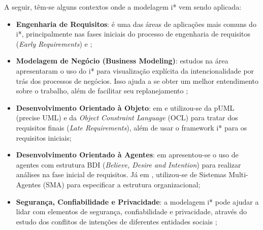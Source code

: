                 A seguir, têm-se alguns contextos onde a modelagem i* vem sendo aplicada:
                    \begin{itemize}
                        \item[] \textbf{Engenharia de Requisitos}:
                            é uma das áreas de aplicações mais comuns do i*, principalmente nas fases iniciais do processo de engenharia de requisitos (\emph{Early Requirements})
                            \cite{yu1997towards} e \cite{maiden2004model};

                        \item[] \textbf{Modelagem de Negócio (Business Modeling)}:
                            estudos na área apresentaram o uso do i* para visualização explícita da intencionalidade por trás dos processos de negócios.
                            Isso ajuda a se obter um melhor entendimento sobre o trabalho, além de facilitar seu replanejamento
                            \cite{yu1996models} \cite{kolp2003organizational};

                        \item[] \textbf{Desenvolvimento Orientado à Objeto}:
                            em \cite{castro2000closing} e \cite{castro2001integrating}
                            utilizou-se da pUML (precise UML) \cite{evans1999core}
                            e da \emph{Object Constraint Language} (OCL) \cite{warmer2003object}
                            para tratar dos requisitos finais (\emph{Late Requirements}), além de usar o framework i* para os requisitos iniciais;

                        \item[] \textbf{Desenvolvimento Orientado à Agentes}:
                            em \cite{bresciani2004tropos} apresentou-se o uso de agentes com estrutura BDI (\emph{Believe, Desire and Intention}) \cite{rao1995bdi} para realizar análises na fase inicial de requisitos.
                            Já em \cite{bastos2004enhancing}, utilizou-se de Sistemas Multi-Agentes (SMA) para especificar a estrutura organizacional;

                        \item[] \textbf{Segurança, Confiabilidade e Privacidade}:
                            a modelagem i* pode ajudar a lidar com elementos de segurança, confiabilidade e privacidade, através do estudo dos conflitos de intenções de diferentes entidades sociais \cite{yu2001modelling};
                    \end{itemize}

